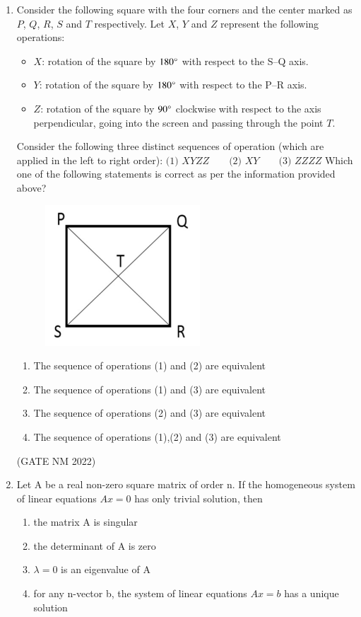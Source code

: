 \documentclass[journal,12pt,onecolumn]{IEEEtran}
\theoremstyle{remark}
\begin{document}
\begin{enumerate}
\item  Consider the following square with the four corners and the center marked as $P$, $Q$, $R$, $S$ and $T$ respectively.  
Let $X$, $Y$ and $Z$ represent the following operations:  
\begin{itemize}
	\item $X$: rotation of the square by $180{\degree}$ with respect to the S--Q axis.
	\item $Y$: rotation of the square by $180{\degree}$ with respect to the P--R axis.
	\item $Z$: rotation of the square by $90{\degree}$ clockwise with respect to the axis perpendicular, going into the screen and passing through the point $T$.
\end{itemize}
Consider the following three distinct sequences of operation (which are applied in the left to right order):  
$
\text{(1) } XYZZ \quad\quad \text{(2) } XY \quad\quad \text{(3) } ZZZZ
$
Which one of the following statements is correct as per the information provided above?  
\begin{figure}[h]
	\centering
	\includegraphics[width=0.2\columnwidth]{fig3}
	\caption{}
	\label{fig:placeholder}
\end{figure}
\begin{enumerate}
    \item The sequence of operations (1) and (2) are equivalent
    \item The sequence of operations (1) and (3) are equivalent
    \item The sequence of operations (2) and (3) are equivalent
    \item The sequence of operations (1),(2) and (3) are equivalent
\end{enumerate}

\hfill(GATE NM 2022)

\item  Let A be a real non-zero square matrix of order n. If the homogeneous system of linear equations $A x = 0$ has only trivial solution, then
\begin{enumerate}
    \item the matrix A is singular
    \item the determinant of A is zero
    \item $\lambda = 0$ is an eigenvalue of A
    \item for any n-vector b, the system of linear equations $A x = b$ has a unique solution
\end{enumerate}


\end{enumerate}
\end{document}
